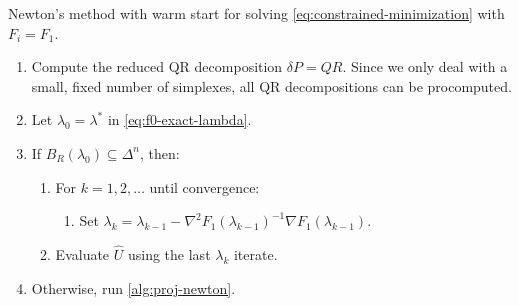 \documentclass[eikonal.tex]{subfiles}
\begin{document}
\begin{algorithm}[H]
  \caption{Newton's method with warm start for solving
    \cref{eq:constrained-minimization} with
    $F_i = F_1$.}\label{alg:warm-start-newton}
  \begin{enumerate}[nolistsep]
  \item Compute the reduced QR decomposition $\delta P = QR$. Since we
    only deal with a small, fixed number of simplexes, all QR
    decompositions can be procomputed.
  \item Let $\lambda_0 = \lambda^*$ in \cref{eq:f0-exact-lambda}.
  \item If $B_R(\lambda_0) \subseteq \Delta^n$, then:
    \begin{enumerate}[nolistsep]
    \item For $k = 1, 2, \hdots$ until convergence:
      \begin{enumerate}
      \item Set
        $\lambda_k = \lambda_{k-1} - \nabla^2
        F_1(\lambda_{k-1})^{-1} \nabla
        F_1(\lambda_{k-1})$.
      \end{enumerate}
    \item Evaluate $\hat{U}$ using the last $\lambda_k$ iterate.
    \end{enumerate}
  \item Otherwise, run \cref{alg:proj-newton}.
  \end{enumerate}
\end{algorithm}
\end{document}
